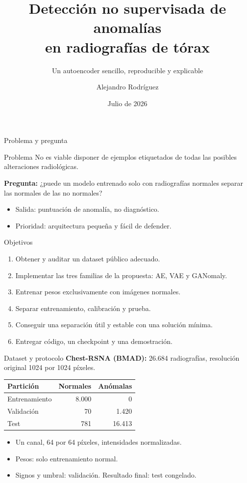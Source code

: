 \documentclass[aspectratio=169,10pt]{beamer}
\title{Detección no supervisada de anomalías\\en radiografías de tórax}
\subtitle{Un autoencoder sencillo, reproducible y explicable}
\author{Alejandro Rodríguez}
\institute{Máster Universitario en Sistemas Inteligentes\\Universitat de les Illes Balears}
\date{Julio de 2026}
\begin{document}
\begin{frame}\titlepage\end{frame}

\begin{frame}{Problema y pregunta}
  \begin{block}{Problema}
    No es viable disponer de ejemplos etiquetados de todas las posibles
    alteraciones radiológicas.
  \end{block}
  \vspace{0.3cm}
  \textbf{Pregunta:} ¿puede un modelo entrenado solo con radiografías normales
  separar las normales de las no normales?
  \begin{itemize}
    \item Salida: puntuación de anomalía, no diagnóstico.
    \item Prioridad: arquitectura pequeña y fácil de defender.
  \end{itemize}
\end{frame}

\begin{frame}{Objetivos}
  \begin{enumerate}
    \item Obtener y auditar un dataset público adecuado.
    \item Implementar las tres familias de la propuesta: AE, VAE y GANomaly.
    \item Entrenar pesos exclusivamente con imágenes normales.
    \item Separar entrenamiento, calibración y prueba.
    \item Conseguir una separación útil y estable con una solución mínima.
    \item Entregar código, un checkpoint y una demostración.
  \end{enumerate}
\end{frame}

\begin{frame}{Dataset y protocolo}
  \textbf{Chest-RSNA (BMAD):} 26.684 radiografías, resolución original
  1024 por 1024 píxeles.
  \begin{center}
  \begin{tabular}{lrr}
    \toprule
    Partición & Normales & Anómalas \\
    \midrule
    Entrenamiento & 8.000 & 0 \\
    Validación & 70 & 1.420 \\
    Test & 781 & 16.413 \\
    \bottomrule
  \end{tabular}
  \end{center}
  \begin{itemize}
    \item Un canal, 64 por 64 píxeles, intensidades normalizadas.
    \item Pesos: solo entrenamiento normal.
    \item Signos y umbral: validación. Resultado final: test congelado.
  \end{itemize}
\end{frame}
\end{document}
